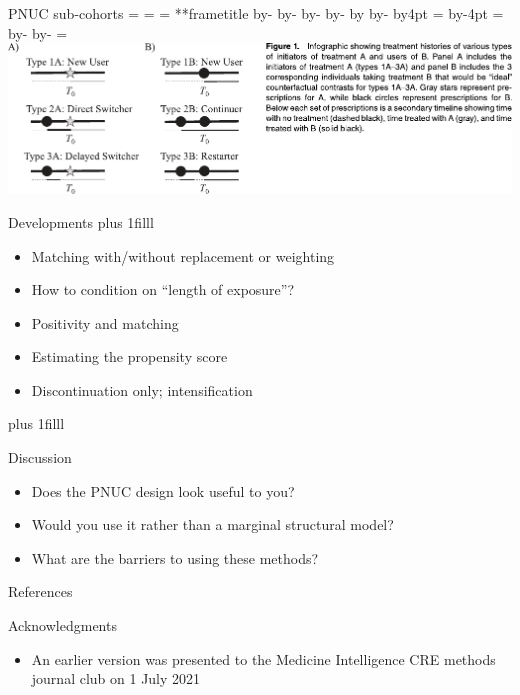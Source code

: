 \documentclass[aspectratio=169,12pt]{beamer} %
\makeatletter
\newif\ifsidebartheme
\newcommand*{\calculatespace}{%
    \contentheight=\paperheight%
    \ifx\beamer@frametitle\@empty%
        \setbox\@tempboxa=\box\voidb@x%
      \else%
        \setbox\@tempboxa=\vbox{%
          \vbox{}%
          {\parskip0pt\usebeamertemplate***{frametitle}}%
        }%
        \ifsidebartheme%
          \advance\contentheight by-1em%
        \fi%
      \fi%
    \advance\contentheight by-\ht\@tempboxa%
    \advance\contentheight by-\dp\@tempboxa%
    \advance\contentheight by-\beamer@frametopskip%
    \ifbeamer@plainframe%
    \contentbottom=0pt%
    \else%
    \advance\contentheight by-\headheight%
    \advance\contentheight by\headdp%
    \advance\contentheight by-\footheight%
    \advance\contentheight by4pt%
    \contentbottom=\footheight%
    \advance\contentbottom by-4pt%
    \fi%
    \contentwidth=\paperwidth%
    \ifbeamer@plainframe%
    \contentleft=0pt%
    \else%
    \advance\contentwidth by-\beamer@rightsidebar%
    \advance\contentwidth by-\beamer@leftsidebar\relax%
    \contentleft=\beamer@leftsidebar%
    \fi%
}
\makeatother
\begin{document}
\begin{frame}{PNUC sub-cohorts}
    \calculatespace%
	\includegraphics[width=0.85\contentwidth]{ref/webster-fig1.pdf}
\end{frame}

\begin{frame}{Developments}
\vskip0pt plus 1filll
    \begin{itemize}
	\item Matching with/without replacement or weighting
	\item How to condition on ``length of exposure''?
	\item Positivity and matching
	\item Estimating the propensity score
	\item Discontinuation only; intensification
    \end{itemize}
\vskip0pt plus 1filll
\nocite{webster-clark_presentation_2020}
\end{frame}

\begin{frame}{Discussion}
    \begin{itemize}
	\item Does the PNUC design look useful to you?
	\item Would you use it rather than a marginal structural model?
    	\item What are the barriers to using these methods?
    \end{itemize}
\end{frame}

\begin{frame}{References}
        \tiny
        
\end{frame}

\begin{frame}{Acknowledgments}
    \begin{itemize}
	\item An earlier version was presented to the Medicine
	Intelligence CRE methods journal club on 1 July 2021
    \end{itemize}
\end{frame}
\end{document}
